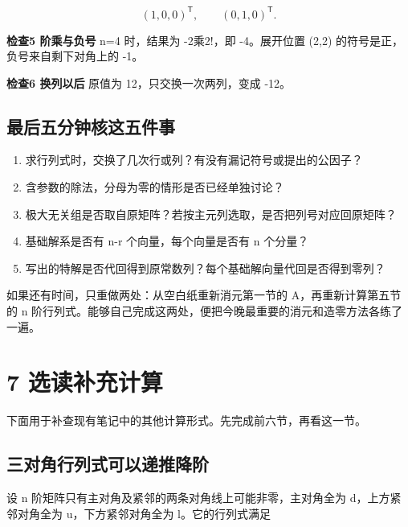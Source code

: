 \documentclass[
  11pt,
  a4paper,
  fontset=fandol]{ctexart}
\providecommand{\tightlist}{%
  \setlength{\itemsep}{0pt}\setlength{\parskip}{0pt}}
\begin{document}
\[(1,0,0)^{\mathsf T},\qquad(0,1,0)^{\mathsf T}.\]

\textbf{检查5 阶乘与负号} n=4 时，结果为 -2乘2!，即 -4。展开位置 (2,2)
的符号是正，负号来自剩下对角上的 -1。

\textbf{检查6 换列以后} 原值为 12，只交换一次两列，变成 -12。


\subsection{最后五分钟核这五件事}\label{ux6700ux540eux4e94ux5206ux949fux6838ux8fd9ux4e94ux4ef6ux4e8b}

\begin{enumerate}
\def\labelenumi{\arabic{enumi}.}
\tightlist
\item
  求行列式时，交换了几次行或列？有没有漏记符号或提出的公因子？
\item
  含参数的除法，分母为零的情形是否已经单独讨论？
\item
  极大无关组是否取自原矩阵？若按主元列选取，是否把列号对应回原矩阵？
\item
  基础解系是否有 n-r 个向量，每个向量是否有 n 个分量？
\item
  写出的特解是否代回得到原常数列？每个基础解向量代回是否得到零列？
\end{enumerate}

如果还有时间，只重做两处：从空白纸重新消元第一节的 A，再重新计算第五节的
n
阶行列式。能够自己完成这两处，便把今晚最重要的消元和造零方法各练了一遍。


\section{7 选读补充计算}\label{7-ux9009ux8bfbux8865ux5145ux8ba1ux7b97}

下面用于补查现有笔记中的其他计算形式。先完成前六节，再看这一节。


\subsection{三对角行列式可以递推降阶}\label{ux4e09ux5bf9ux89d2ux884cux5217ux5f0fux53efux4ee5ux9012ux63a8ux964dux9636}

设 n 阶矩阵只有主对角及紧邻的两条对角线上可能非零，主对角全为
d，上方紧邻对角全为 u，下方紧邻对角全为 l。它的行列式满足
\end{document}
